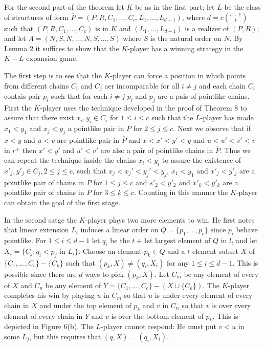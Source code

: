 \documentclass[twoside]{article}
\begin{document}
For the second part of the theorem let $K$ be as in the first part; let $L$ be the class
of structures of form $\overline{P} = (P,R,C_1,...,C_c,L_1,...,L_{d-1})$, where $d=c{{c-1}\choose {t}}$
such that $(P,R,C_1,...,C_c)$ is in $K$ and $(L_1,...,L_{d-1})$ is a realizer of $(P,R)$;
and let $A=(N,S,N,...,N,S,...,S)$ where $S$ is the natural order on $N$. By Lemma 2 it suffices to show that the $K$-player
has a winning strategy in the $K-L$ expansion game.

The first step is to see that the $K$-player can force a position in which points
from different chains $C_i$ and $C_j$ aer incomparable for all $i \neq j$ and each chain $C_i$ contais pair $p_i$ such that
for each $i \neq j$ $p_i$ and $p_j$ are a pais of pointlike chains. First the $K$-player uses the 
technique developed in the proof of Theorem 8 to assure that there exist $x_i,y_i \in C_i$
for $1 \leq i \leq c$ such that the $L$-player has made $x_1<y_1$ and $x_j< y_j$ a pointlike 
pair in $\overline{P}$ for $2 \leq j \leq c$. Next we observe that if $x<y$ and $u<v$ are pointlike pair in 
$\overline{P}$ and $x<x'<y'<y$ and $u<u'<v'<v$ in $r^+$ then $x'<y'$ and $u'<v'$ are also a pair of 
pointlike chains in $\overline{P}$. Thus we can repeat the technique inside the chains $x_i < y_i$
to assure the existence of $x'_j,y'_j \in C_j, 2 \leq j\leq c$, such that $x_j<x_j'<y_j'<y_j$,
$x_1<y_1$ and $x'_j<y'_j$ are a pointlike pair of chains in $\overline{P}$ for $1\leq j\leq c$ 
and $s'_2<y'_2$ and $x'_k < y'_k$ are a pointlike pair of chains in $\overline{P}$ for $3 \leq k \leq c$.
Counting in this manner the $K$-player can obtain the goal of the first stage.

In the second satge the $K$-player plays two more elements to win. He first notes that linear extension $L_i$
induces a linear order on $Q=\{p_1,...,p_c\}$ since $p_i$ behave pointlike. For $1\leq i \leq d-1$ let
$q_i$ be the $t+1$st largest element of $Q$ in $l_i$ and let $X_i = \{C_j:q_i<p_j$ in $ L_i\}$.
Choose an element $p_k \in Q$ and a $t$ element subset $X$ of $\{C_1,...,C_c\} - \{C_k\}$ such that
$(p_k,X) \neq (q_i, X_i)$ for any $1 \leq i \leq d-1$. This is possible since there are $d$ ways to pick
$(p_k, X)$. Let $C_m$ be any element of every of $X$ and $C_n$ be any element of
$Y=\{C_1,...,C_c\}-(X\cup \{C_k\})$. The $K$-player completes his win by playing $u$ in $C_m$ so that
$u$ is under every element of every chain in  $X$ and under the top element of $p_k$ and $v$ in $C_n$
so that $v$ is over every element of every chain in $Y$ and $v$ is over the bottom element of $p_k$.
This is depicted in Figure 6(b). The $L$-player cannot respond: He must put $v<u$ in some $L_j$, but
this requires that $(q,X)=(q_i,X_i)$.\\
\end{document}
